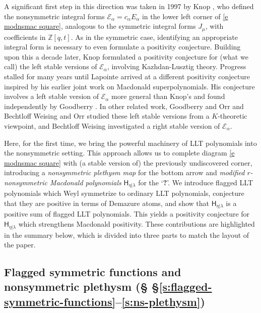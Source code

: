 \documentclass[12pt]{amsart}
\theoremstyle{definition}
\theoremstyle{remark}
\newcommand{\ZZ}{{\mathbb Z}}
\newcommand{\Ecal}{{\mathcal E}}
\newcommand{\mE}{\mathsf H}   %
\begin{document}
A significant first step in this direction was taken in 1997 by Knop
\cite{Knop97}, who defined the nonsymmetric integral forms
$\Ecal_\alpha = c_\alpha E_\alpha$ in the lower left corner of
\eqref{e modnsmac square}, analogous to the symmetric integral forms
$J_\mu$, with coefficients in $\ZZ[q,t]$.  As in the symmetric case,
identifying an appropriate integral form is necessary to even
formulate a positivity conjecture.  Building upon this a decade later,
Knop \cite{Knop07} formulated a positivity conjecture for (what we
call) the left stable versions of $\Ecal_\alpha$, involving
Kazhdan-Lusztig theory.  Progress stalled for many years until
Lapointe \cite{Lapointe22} arrived at a different positivity
conjecture inspired by his earlier joint work \cite{BFDLM12a,BFDLM12b}
on Macdonald superpolynomials.  His conjecture involves a left stable
version of $\Ecal_\alpha$ more general than Knop's and found
independently by Goodberry \cite{Goodberry22,Goodberry24}.  In other
related work, Goodberry and Orr \cite{GoodberryOrr} and Bechtloff
Weising and Orr \cite{BWOrr} studied these left stable versions from a
$K$-theoretic viewpoint, and Bechtloff Weising
\cite{BechtloffWeising23} investigated a right stable version of
$\Ecal_\alpha$.

Here, for the first time, we bring the powerful machinery of LLT
polynomials into the nonsymmetric setting. This approach allows us to
complete diagram \eqref{e modnsmac square} with (a stable version of)
the previously undiscovered corner, introducing a \emph{nonsymmetric
plethysm map} for the bottom arrow and \emph{modified $r$-nonsymmetric
Macdonald polynomials} $\mE_{\eta|\lambda}$ for the `\textbf{?}'.  We
introduce flagged LLT polynomials which Weyl symmetrize to ordinary
LLT polynomials, conjecture that they are positive in terms of
Demazure atoms, and show that $\mE_{\eta|\lambda}$ is a positive sum
of flagged LLT polynomials.  This yields a positivity conjecture for
$\mE_{\eta|\lambda}$ which strengthens Macdonald positivity.  These
contributions are highlighted in the summary below, which is divided
into three parts to match the layout of the paper.



\subsection{Flagged symmetric functions and nonsymmetric plethysm (\S
\S \ref{s:flagged-symmetric-functions}--\ref{s:ns-plethysm})}
\end{document}
